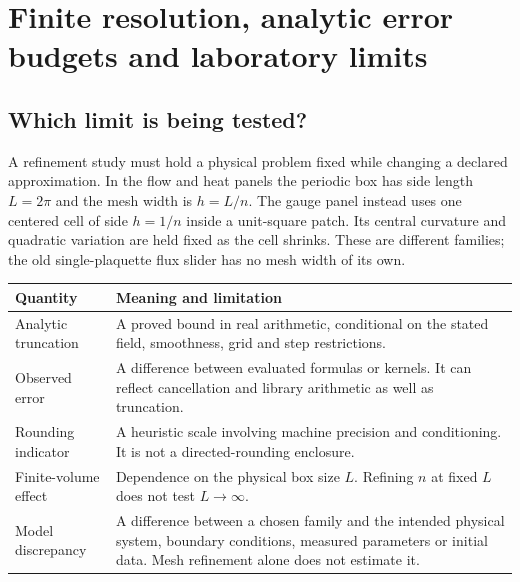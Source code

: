 \chapter{Finite resolution, analytic error budgets and laboratory limits}
\label{ch:finite-resolution}


\section{Which limit is being tested?}

A refinement study must hold a physical problem fixed while changing a
declared approximation. In the flow and heat panels the periodic box has
side length $L=2\pi$ and the mesh width is $h=L/n$. The gauge panel
instead uses one centered cell of side $h=1/n$ inside a unit-square patch.
Its central curvature and quadratic variation are held fixed as the cell
shrinks. These are different families; the old single-plaquette flux
slider has no mesh width of its own.

\begin{longtable}{p{}p{}}
\toprule Quantity & Meaning and limitation\\\midrule
\endhead
Analytic truncation & A proved bound in real arithmetic, conditional on the
stated field, smoothness, grid and step restrictions.\\
Observed error & A difference between evaluated formulas or kernels.
It can reflect cancellation and library arithmetic as well as truncation.\\
Rounding indicator & A heuristic scale involving machine precision and
conditioning. It is not a directed-rounding enclosure.\\
Finite-volume effect & Dependence on the physical box size $L$.
Refining $n$ at fixed $L$ does not test $L\to\infty$.\\
Model discrepancy & A difference between a chosen family and the intended
physical system, boundary conditions, measured parameters or initial data.
Mesh refinement alone does not estimate it.\\
\bottomrule
\end{longtable}

